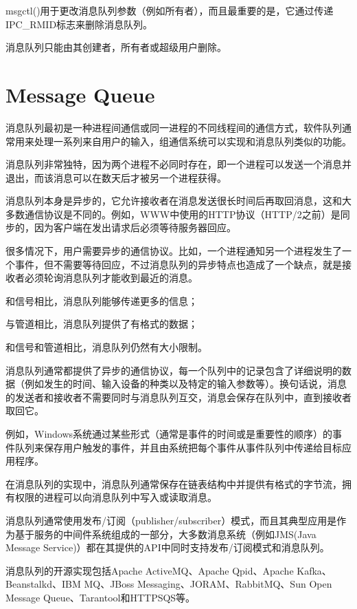 msgctl()用于更改消息队列参数（例如所有者），而且最重要的是，它通过传递IPC\_RMID标志来删除消息队列。 

消息队列只能由其创建者，所有者或超级用户删除。


\section{Message Queue}


消息队列最初是一种进程间通信或同一进程的不同线程间的通信方式，软件队列通常用来处理一系列来自用户的输入，组通信系统可以实现和消息队列类似的功能。

消息队列非常独特，因为两个进程不必同时存在，即一个进程可以发送一个消息并退出，而该消息可以在数天后才被另一个进程获得。

消息队列本身是异步的，它允许接收者在消息发送很长时间后再取回消息，这和大多数通信协议是不同的。例如，WWW中使用的HTTP协议（HTTP/2之前）是同步的，因为客户端在发出请求后必须等待服务器回应。

很多情况下，用户需要异步的通信协议。比如，一个进程通知另一个进程发生了一个事件，但不需要等待回应，不过消息队列的异步特点也造成了一个缺点，就是接收者必须轮询消息队列才能收到最近的消息。

\begin{compactitem}
\item 和信号相比，消息队列能够传递更多的信息；
\item 与管道相比，消息队列提供了有格式的数据；
\item 和信号和管道相比，消息队列仍然有大小限制。
\end{compactitem}

消息队列通常都提供了异步的通信协议，每一个队列中的记录包含了详细说明的数据（例如发生的时间、输入设备的种类以及特定的输入参数等）。换句话说，消息的发送者和接收者不需要同时与消息队列互交，消息会保存在队列中，直到接收者取回它。

例如，Windows系统通过某些形式（通常是事件的时间或是重要性的顺序）的事件队列来保存用户触发的事件，并且由系统把每个事件从事件队列中传递给目标应用程序。

在消息队列的实现中，消息队列通常保存在链表结构中并提供有格式的字节流，拥有权限的进程可以向消息队列中写入或读取消息。

消息队列通常使用发布/订阅（publisher/subscriber）模式，而且其典型应用是作为基于服务的中间件系统组成的一部分，大多数消息系统（例如JMS(Java Message Service)）都在其提供的API中同时支持发布/订阅模式和消息队列。

消息队列的开源实现包括Apache ActiveMQ、Apache Qpid、Apache Kafka、Beanstalkd、IBM MQ、JBoss Messaging、JORAM、RabbitMQ、Sun Open Message Queue、Tarantool和HTTPSQS等。

